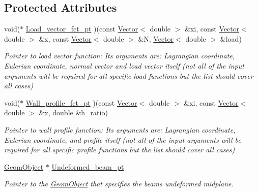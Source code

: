 \subsection*{Protected Attributes}
\begin{DoxyCompactItemize}
\item 
void($\ast$ \hyperlink{classoomph_1_1KirchhoffLoveBeamEquations_a66707c32b8a08bcf6e8ed855066f9618}{Load\+\_\+vector\+\_\+fct\+\_\+pt} )(const \hyperlink{classoomph_1_1Vector}{Vector}$<$ double $>$ \&xi, const \hyperlink{classoomph_1_1Vector}{Vector}$<$ double $>$ \&x, const \hyperlink{classoomph_1_1Vector}{Vector}$<$ double $>$ \&N, \hyperlink{classoomph_1_1Vector}{Vector}$<$ double $>$ \&load)
\begin{DoxyCompactList}\small\item\em Pointer to load vector function\+: Its arguments are\+: Lagrangian coordinate, Eulerian coordinate, normal vector and load vector itself (not all of the input arguments will be required for all specific load functions but the list should cover all cases) \end{DoxyCompactList}\item 
void($\ast$ \hyperlink{classoomph_1_1KirchhoffLoveBeamEquations_a6ca999fcdf45f0cf51b0a74a1025ed53}{Wall\+\_\+profile\+\_\+fct\+\_\+pt} )(const \hyperlink{classoomph_1_1Vector}{Vector}$<$ double $>$ \&xi, const \hyperlink{classoomph_1_1Vector}{Vector}$<$ double $>$ \&x, double \&h\+\_\+ratio)
\begin{DoxyCompactList}\small\item\em Pointer to wall profile function\+: Its arguments are\+: Lagrangian coordinate, Eulerian coordinate, and profile itself (not all of the input arguments will be required for all specific profile functions but the list should cover all cases) \end{DoxyCompactList}\item 
\hyperlink{classoomph_1_1GeomObject}{Geom\+Object} $\ast$ \hyperlink{classoomph_1_1KirchhoffLoveBeamEquations_a3e89080f7df640c70c8ec3bf85fb74c9}{Undeformed\+\_\+beam\+\_\+pt}
\begin{DoxyCompactList}\small\item\em Pointer to the \hyperlink{classoomph_1_1GeomObject}{Geom\+Object} that specifies the beam\textquotesingle{}s undeformed midplane. \end{DoxyCompactList}\end{DoxyCompactItemize}

